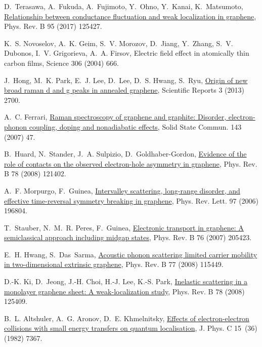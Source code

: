\documentclass[final,5p,times,twocolumn]{elsarticle}
\begin{document}
\begin{thebibliography}{10}
D.~Terasawa, A.~Fukuda, A.~Fujimoto, Y.~Ohno, Y.~Kanai, K.~Matsumoto,
  \href{https://link.aps.org/doi/10.1103/PhysRevB.95.125427}{Relationship
  between conductance fluctuation and weak localization in graphene}, Phys.
  Rev. B 95 (2017) 125427.

K.~S. Novoselov, A.~K. Geim, S.~V. Morozov, D.~Jiang, Y.~Zhang, S.~V. Dubonos,
  I.~V. Grigorieva, A.~A. Firsov, Electric field effect in atomically thin
  carbon films, Science 306 (2004) 666.

J.~Hong, M.~K. Park, E.~J. Lee, D.~Lee, D.~S. Hwang, S.~Ryu,
  \href{http://dx.doi.org/10.1038/srep02700}{Origin of new broad raman d and g
  peaks in annealed graphene}, Scientific Reports 3 (2013) 2700.
  
A.~C. Ferrari,
  \href{http://www.sciencedirect.com/science/article/pii/S0038109807002967}{Raman
  spectroscopy of graphene and graphite: Disorder, electron-phonon coupling,
  doping and nonadiabatic effects}, Solid State Commun. 143 (2007) 47.

B.~Huard, N.~Stander, J.~A. Sulpizio, D.~Goldhaber-Gordon,
  \href{http://link.aps.org/doi/10.1103/PhysRevB.78.121402}{Evidence of the
  role of contacts on the observed electron-hole asymmetry in graphene}, Phys.
  Rev. B 78 (2008) 121402.

A.~F. Morpurgo, F.~Guinea,
  \href{http://link.aps.org/doi/10.1103/PhysRevLett.97.196804}{Intervalley
  scattering, long-range disorder, and effective time-reversal symmetry
  breaking in graphene}, Phys. Rev. Lett. 97 (2006) 196804.

T.~Stauber, N.~M.~R. Peres, F.~Guinea,
  \href{http://link.aps.org/doi/10.1103/PhysRevB.76.205423}{Electronic
  transport in graphene: A semiclassical approach including midgap states},
  Phys. Rev. B 76 (2007) 205423.

E.~H. Hwang, S.~Das~Sarma,
  \href{http://link.aps.org/doi/10.1103/PhysRevB.77.115449}{Acoustic phonon
  scattering limited carrier mobility in two-dimensional extrinsic graphene},
  Phys. Rev. B 77 (2008) 115449.

D.-K. Ki, D.~Jeong, J.-H. Choi, H.-J. Lee, K.-S. Park,
  \href{http://link.aps.org/doi/10.1103/PhysRevB.78.125409}{Inelastic
  scattering in a monolayer graphene sheet: A weak-localization study}, Phys.
  Rev. B 78 (2008) 125409.

B.~L. Altshuler, A.~G. Aronov, D.~E. Khmelnitsky,
  \href{http://stacks.iop.org/0022-3719/15/i=36/a=018}{Effects of
  electron-electron collisions with small energy transfers on quantum
  localisation}, J. Phys. C 15~(36) (1982) 7367.


\end{thebibliography}
\end{document}

